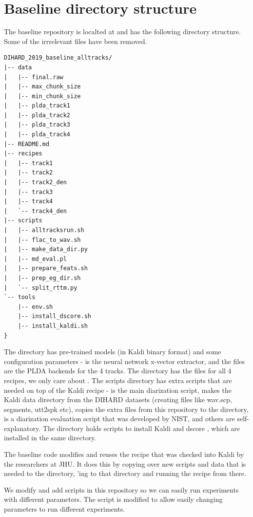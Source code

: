 \section{Baseline directory structure}
The baseline repository is localted at  and has the following directory structure. Some of the irrrelevant files have been removed.

\begin{verbatim}
DIHARD_2019_baseline_alltracks/
|-- data
|   |-- final.raw
|   |-- max_chunk_size
|   |-- min_chunk_size
|   |-- plda_track1
|   |-- plda_track2
|   |-- plda_track3
|   |-- plda_track4
|-- README.md
|-- recipes
|   |-- track1
|   |-- track2
|   |-- track2_den
|   |-- track3
|   |-- track4
|   `-- track4_den
|-- scripts
|   |-- alltracksrun.sh
|   |-- flac_to_wav.sh
|   |-- make_data_dir.py
|   |-- md_eval.pl
|   |-- prepare_feats.sh
|   |-- prep_eg_dir.sh
|   `-- split_rttm.py
`-- tools
    |-- env.sh
    |-- install_dscore.sh
    |-- install_kaldi.sh
}
\end{verbatim}

The  directory has pre-trained models (in Kaldi binary format) and some configuration parameters -  is the neural network x-vector extractor, and the  files are the PLDA backends for the 4 tracks. The  directory has the  files for all 4 recipes, we only care about . The scripts directory has extra scripts that are needed on top of the  Kaldi recipe -  is the main diarization script,  makes the Kaldi data directory from the DIHARD datasets (creating files like wav.scp, segments, utt2spk etc),  copies the extra files from this repository to the  directory,  \cite{mdeval2006} is a diarization evaluation script that was developed by NIST, and others are self-explanatory. The  directory holds scripts to install Kaldi and dscore \cite{dscore}, which are installed in the same directory.

The baseline code modifies and reuses the  recipe that was checked into Kaldi by the researchers at JHU. It does this by copying over new scripts and data that is needed to the  directory, 'ing to that directory and running the recipe from there.

We modify and add scripts in this repository so we can easily run experiments with different parameters. The  script is modified to allow easily changing parameters to run different experiments.

